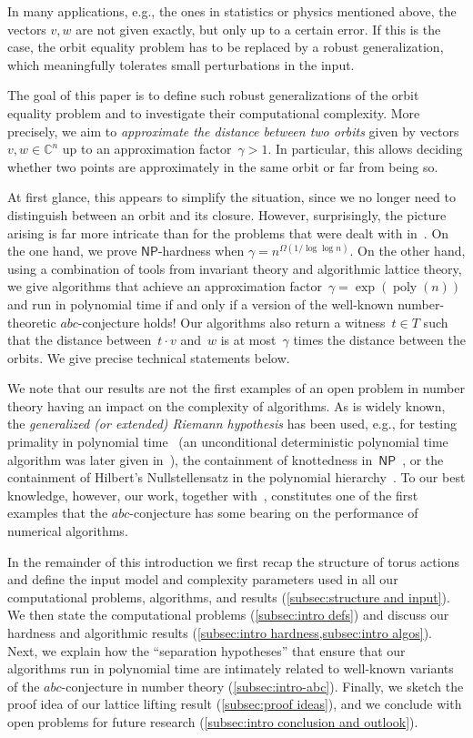 \documentclass[a4paper,USenglish,cleveref,numberwithinsect]{lipics-v2021}
\DeclareMathOperator{\poly}{poly}
\newcommand{\CC}{\mathbb{C}}
\newcommand{\NP}{\ensuremath{\mathsf{NP}}\xspace}
\newcommand{\abc}{\texorpdfstring{$abc$}{abc}}
\numberwithin{equation}{section}
\begin{document}
In many applications,
e.g., the ones in statistics or physics mentioned above,
the vectors $v,w$ are not given exactly, but only up to a certain error.
If this is the case, the orbit equality problem has to be replaced
by a robust generalization, which meaningfully tolerates small perturbations in the input.

The goal of this paper is to define such robust generalizations of the orbit equality problem and to investigate their computational complexity.
More precisely, we aim to \emph{approximate the distance between two orbits} given by vectors~$v,w \in \CC^n$
up to an approximation factor~$\gamma>1$.
In particular, this allows deciding whether two points are approximately in the same orbit or far from being so.

At first glance, this appears to simplify the situation, since we no longer need to distinguish between an orbit and its closure.
However, surprisingly, the picture arising is far more intricate than for the problems that were dealt with in~\cite{torus}.
On the one hand, we prove \NP-hardness when $\gamma = n^{\Omega(1/\!\log\log n)}$.
On the other hand, using a combination of tools from invariant theory and algorithmic lattice theory,
we give algorithms that achieve an approximation factor~$\gamma = \exp(\poly(n))$ and run in polynomial time
if and only if a version of the well-known number-theoretic \abc-conjecture holds!
Our algorithms also return a witness~$t \in T$ such that the distance between~$t \cdot v$ and~$w$ is at most~$\gamma$ times
the distance between the orbits.
We give precise technical statements below.

We note that our results are not the first examples of an open problem in number theory
having an impact on the complexity of algorithms.
As is widely known, the \textit{generalized (or extended) Riemann hypothesis} has been used, e.g.,
for testing primality in polynomial time~\cite{miller-primality}
(an unconditional deterministic polynomial time algorithm was later given in~\cite{aks-primality}),
the containment of knottedness in~\NP~\cite{kuperberg-knot},
or the containment of Hilbert's Nullstellensatz in the polynomial hierarchy~\cite{koiran-hn}.
To our best knowledge, however, our work, together with~\cite{mono-testing-abc},
constitutes one of the first examples that the \abc-conjecture has some bearing
on the performance of numerical algorithms.

In the remainder of this introduction we first recap the structure of torus actions and
define the input model and complexity parameters used in all our computational problems, algorithms,
and results (\cref{subsec:structure and input}).
We then state the computational problems (\cref{subsec:intro defs}) and discuss our
hardness and algorithmic results (\cref{subsec:intro hardness,subsec:intro algos}).
Next, we explain how the ``separation hypotheses'' that ensure that our algorithms run
in polynomial time are intimately related to well-known variants of
the $abc$-conjecture in number theory (\cref{subsec:intro-abc}).
Finally, we sketch the proof idea of our lattice lifting result (\cref{subsec:proof ideas}),
and we conclude with open problems for future research (\cref{subsec:intro conclusion and outlook}).
\end{document}
